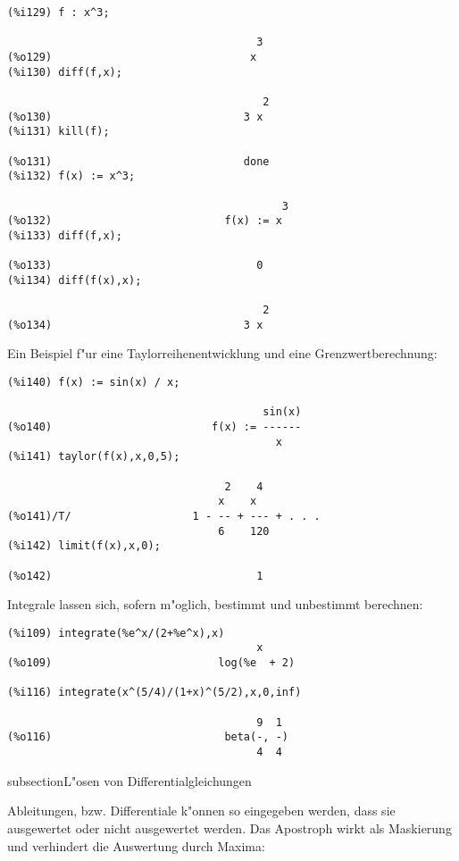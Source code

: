 \documentclass[spanish,12pt,a4paper]{article}
\begin{document}
\scriptsize
\begin{verbatim}
(%i129) f : x^3;

                                       3
(%o129)                               x
(%i130) diff(f,x);

                                        2
(%o130)                              3 x
(%i131) kill(f);

(%o131)                              done
(%i132) f(x) := x^3;

                                           3
(%o132)                           f(x) := x
(%i133) diff(f,x);

(%o133)                                0
(%i134) diff(f(x),x);

                                        2
(%o134)                              3 x
\end{verbatim}
\normalsize

Ein Beispiel f"ur eine Taylorreihenentwicklung und eine Grenzwertberechnung:

\scriptsize
\begin{verbatim}
(%i140) f(x) := sin(x) / x;

                                        sin(x)
(%o140)                         f(x) := ------
                                          x
(%i141) taylor(f(x),x,0,5);

                                  2    4
                                 x    x
(%o141)/T/                   1 - -- + --- + . . .
                                 6    120
(%i142) limit(f(x),x,0);

(%o142)                                1
\end{verbatim}
\normalsize

Integrale lassen sich, sofern m"oglich, bestimmt und unbestimmt berechnen:

\scriptsize
\begin{verbatim}
(%i109) integrate(%e^x/(2+%e^x),x)
                                       x
(%o109)                          log(%e  + 2)

(%i116) integrate(x^(5/4)/(1+x)^(5/2),x,0,inf)

                                       9  1
(%o116)                           beta(-, -)
                                       4  4
\end{verbatim}
\normalsize


subsection{L"osen von Differentialgleichungen}

Ableitungen, bzw. Differentiale k"onnen so eingegeben werden, dass sie ausgewertet oder nicht ausgewertet werden. Das Apostroph wirkt als Maskierung und verhindert die Auswertung durch Maxima:
\end{document}
